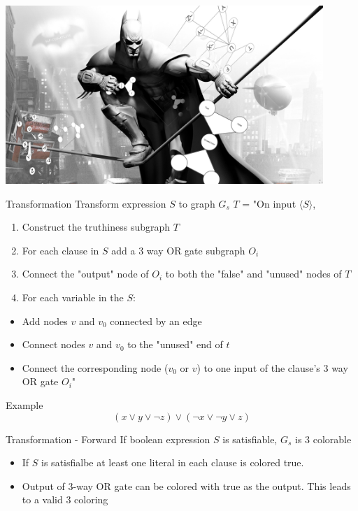 \documentclass[bigger]{beamer}
\begin{document}
\begin{frame}[label=sec-14]{}
\begin{center}
\includegraphics[width=12cm]{bats.png}
\end{center}
\end{frame}

\begin{frame}[label=sec-15]{Transformation}
Transform expression \(S\) to graph \(G_s\)
\(T\) = "On input \(\langle S \rangle\),
\begin{enumerate}
\item<1-> Construct the truthiness subgraph \(T\)\\
\item<2-> For each clause in \(S\) add a 3 way OR gate subgraph \(O_i\)\\
\item<3-> Connect the "output" node of \(O_i\) to both the "false" and "unused" nodes of \(T\)
\item<4-> For each variable in the \(S\):
\end{enumerate}
\begin{itemize}
\item<5-> Add nodes \(v\) and \(v_0\) connected by an edge
\item<6-> Connect nodes \(v\) and \(v_0\) to the "unused" end of \(t\)
\item<7-> Connect the corresponding node (\(v_0\) or \(v\)) to one input of the clause's 3 way OR gate \(O_i\)"
\end{itemize}
\end{frame}

\begin{frame}[label=sec-16]{Example}
\[
(x \vee y \vee \neg z) \vee (\neg x \vee \neg y \vee z)
\]
\end{frame}

\begin{frame}[label=sec-17]{Transformation - Forward}
If boolean expression \(S\) is satisfiable, \(G_s\) is 3 colorable

\begin{itemize}
\item<1-> If \(S\) is satisfialbe at least one literal in each clause is colored true.
\item<2-> Output of 3-way OR gate can be colored with true as the output. This leads to a valid 3 coloring
\end{itemize}
\end{frame}
\end{document}
